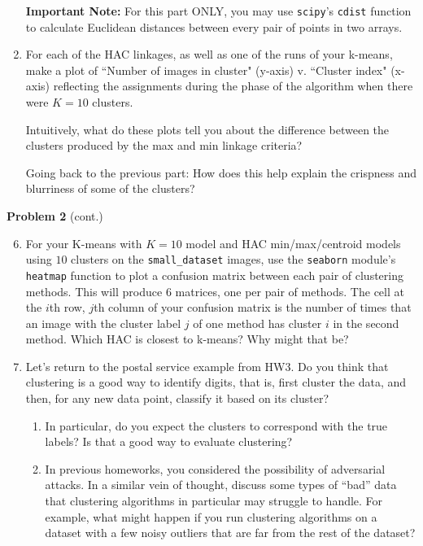 \documentclass[submit]{../harvardml}
\begin{document}
\begin{problem}
\begin{enumerate}
      \textbf{Important Note:} For this part ONLY, you may use
      \texttt{scipy}'s \texttt{cdist} function to calculate Euclidean
      distances between every pair of points in two arrays.

    \item For each of the HAC linkages, as well as one of the runs of your
      k-means, make a plot of ``Number of images in cluster" (y-axis)
      v. ``Cluster index" (x-axis) reflecting the assignments during the
      phase of the algorithm when there were $K=10$ clusters.

      Intuitively, what do these plots tell you about the difference
      between the clusters produced by the max and min linkage criteria?

      Going back to the previous part: How does this help explain the
      crispness and blurriness of some of the clusters?  
  \end{enumerate}
\end{problem}
\newpage
\begin{framed}
  \noindent\textbf{Problem 2} (cont.)\\
  \begin{enumerate}
  \setcounter{enumi}{5}
    \item For your K-means with $K = 10$ model and HAC min/max/centroid
      models using $10$ clusters on the \texttt{small\_dataset} images,
      use the \texttt{seaborn} module's \texttt{heatmap} function to plot
      a confusion matrix between each pair of clustering methods.  This
      will produce 6 matrices, one per pair of methods. The cell at the
      $i$th row, $j$th column of your confusion matrix is the number of
      times that an image with the cluster label $j$ of one method has
      cluster $i$ in the second method.  Which HAC is closest to k-means?
      Why might that be?

    \item Let's return to the postal service example from HW3.  Do you
      think that clustering is a good way to identify digits, that is,
      first cluster the data, and then, for any new data point, classify
      it based on its cluster?
      \begin{enumerate}
        \item In particular, do you expect the clusters to correspond with the
          true labels?  Is that a good way to evaluate clustering?
        
        \item In previous homeworks, you considered the possibility of adversarial attacks. 
        In a similar vein of thought, discuss some types of ``bad'' data that clustering algorithms 
        in particular may struggle to handle. For example, what might happen if you run clustering algorithms
        on a dataset with a few noisy outliers that are far from the rest of the dataset?
      \end{enumerate}
  \end{enumerate}
\end{framed}
\end{document}
